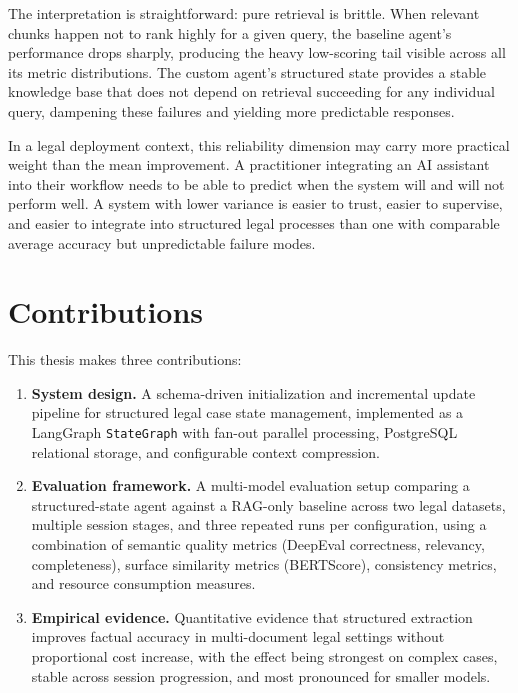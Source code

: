 The interpretation is straightforward: pure retrieval is brittle. When relevant chunks
happen not to rank highly for a given query, the baseline agent's performance drops
sharply, producing the heavy low-scoring tail visible across all its metric
distributions. The custom agent's structured state provides a stable knowledge base
that does not depend on retrieval succeeding for any individual query, dampening these
failures and yielding more predictable responses.

In a legal deployment context, this reliability dimension may carry more practical
weight than the mean improvement. A practitioner integrating an AI assistant into their
workflow needs to be able to predict when the system will and will not perform well.
A system with lower variance is easier to trust, easier to supervise, and easier to
integrate into structured legal processes than one with comparable average accuracy but
unpredictable failure modes.

\section{Contributions}

This thesis makes three contributions:

\begin{enumerate}
    \item \textbf{System design.} A schema-driven initialization and incremental update
    pipeline for structured legal case state management, implemented as a LangGraph
    \texttt{StateGraph} with fan-out parallel processing, PostgreSQL relational storage,
    and configurable context compression.

    \item \textbf{Evaluation framework.} A multi-model evaluation setup comparing a
    structured-state agent against a RAG-only baseline across two legal datasets,
    multiple session stages, and three repeated runs per configuration, using a combination
    of semantic quality metrics (DeepEval correctness, relevancy, completeness), surface
    similarity metrics (BERTScore), consistency metrics, and resource consumption measures.

    \item \textbf{Empirical evidence.} Quantitative evidence that structured extraction
    improves factual accuracy in multi-document legal settings without proportional cost
    increase, with the effect being strongest on complex cases, stable across session
    progression, and most pronounced for smaller models.
\end{enumerate}

